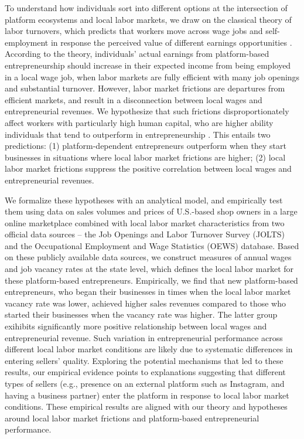 \documentclass[letterpaper,12pt]{article}
\begin{document}
To understand how individuals sort into different options at the intersection of platform ecosystems and local labor markets, we draw on the classical theory of labor turnovers, which predicts that workers move across wage jobs and self-employment in response the perceived value of different earnings opportunities \citep{jovanovic_job_1979,jovanovic_matching_1984}. According to the theory, individuals’ actual earnings from platform-based entrepreneurship should increase in their expected income from being employed in a local wage job, when labor markets are fully efficient with many job openings and substantial turnover. However, labor market frictions are departures from efficient markets, and result in a disconnection between local wages and entrepreneurial revenues. We hypothesize that such frictions disproportionately affect workers with particularly high human capital, who are higher ability individuals that tend to outperform in entrepreneurship \citep{elfenbein_small_2010,chatterji_learning_2016}. This entails two predictions: (1) platform-dependent entrepreneurs outperform when they start businesses in situations where local labor market frictions are higher; (2) local labor market frictions suppress the positive correlation between local wages and entrepreneurial revenues.

We formalize these hypotheses with an analytical model, and empirically test them using data on sales volumes and prices of U.S.-based shop owners in a large online marketplace combined with local labor market characteristics from two official data sources – the Job Openings and Labor Turnover Survey (JOLTS) and the Occupational Employment and Wage Statistics (OEWS) database. Based on these publicly available data sources, we construct measures of annual wages and job vacancy rates at the state level, which defines the local labor market for these platform-based entrepreneurs. Empirically, we find that new platform-based entrepreneurs, who began their businesses in times when the local labor market vacancy rate was lower, achieved higher sales revenues compared to those who started their businesses when the vacancy rate was higher. The latter group exihibits significantly more positive relationship between local wages and entrepreneurial revenue. Such variation in entrepreneurial performance across different local labor market conditions are likely due to systematic differences in entering sellers' quality. Exploring the potential mechanisms that led to these results, our empirical evidence points to explanations suggesting that different types of sellers (e.g., presence on an external platform such as Instagram, and having a business partner) enter the platform in response to local labor market conditions. These empirical results are aligned with our theory and hypotheses around local labor market frictions and platform-based entrepreneurial performance. 
\end{document}
